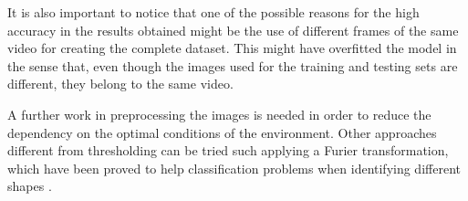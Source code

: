 \documentclass[a4paper,10pt,english]{article}
\begin{document}
    It is also important to notice that one of the possible reasons for the high accuracy in the results obtained might be the use of different frames of the same video for creating the complete dataset. This might have overfitted the model in the sense that, even though the images used for the training and testing sets are different, they belong to the same video.
    
    A further work in preprocessing the images is needed in order to reduce the dependency on the optimal conditions of the environment. Other approaches different from thresholding can be tried such applying a Furier transformation, which have been proved to help classification problems when identifying different shapes \cite{singh2010svm}.
    
    
    
    \vspace{30pt}
     
   
   \vspace{5ex} 
    
\end{document}
